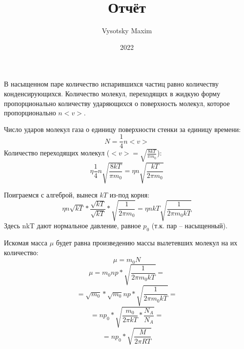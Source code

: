 \documentclass[a4paper,12pt]{article}
\author{Vysotsky Maxim}
\title{Отчёт}
\date{2022}
\begin{document}
	В насыщенном паре количество испарившихся частиц равно количеству конденсирующихся. Количество молекул, переходящих в жидкую форму пропорционально количеству ударяющихся о поверхность молекул, которое пропорционально $n<v>$.
	
	Число ударов молекул газа о единицу поверхности стенки за единицу времени:
	$$ N = \frac{1}{4}n<v> $$
	Количество переходящих молекул ($<v> = \sqrt{\frac{8kT}{\pi m_0}}$):
	$$\eta \frac{1}{4}n \sqrt{\frac{8kT}{\pi m_0}} = \eta n \sqrt{\frac{kT}{2\pi m_0}}$$
	
	Поиграемся с алгеброй, вынеся $kT$ из-под корня:
	$$\eta n \sqrt{kT} * \frac{\sqrt{kT}}{\sqrt{kT}} * \sqrt{\frac{1}{2\pi m_0}} = \eta nkT \sqrt{\frac{1}{2\pi m_0 kT}}
	$$
	Здесь nkT дают нормальное давление, равное $p_0$ (т.к. пар -- насыщенный).
	
	Искомая масса $\mu$ будет равна произведению массы вылетевших молекул на их количество:
	$$\mu = m_0N$$
	$$\mu = m_0np*\sqrt{\frac{1}{2\pi m_0kT}} = $$	
	$$ = \sqrt{m_0}*\sqrt{m_0}np*\sqrt{\frac{1}{2\pi m_0kT}} = $$
	$$ = np_0*\sqrt{\frac{m_0}{2\pi kT} * \frac{N_A}{N_A}} =$$
	$$ = np_0*\sqrt{\frac{M}{2\pi RT}}$$
	
	
	
	
	
	
	
	
\end{document}
